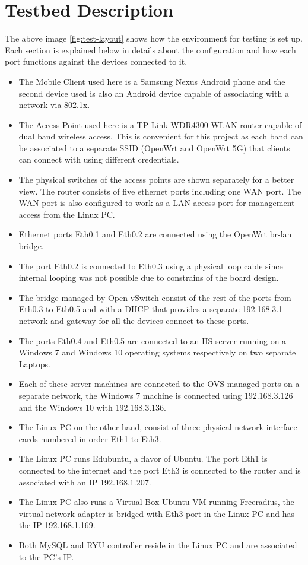 \section{Testbed Description}
The above image \ref{fig:test-layout} shows how the environment for testing is set up. Each section is explained below in details about the configuration and how each port functions against the devices connected to it.
\begin{itemize}
	\item The Mobile Client used here is a Samsung Nexus Android phone and the second device used is also an Android device capable of associating with a network via 802.1x.
	\item The Access Point used here is a TP-Link WDR4300 WLAN router capable of dual band wireless access. This is convenient for this project as each band can be associated to a separate SSID (OpenWrt and OpenWrt 5G) that clients can connect with using different credentials.
	\item The physical switches of the access points are shown separately for a better view. The router consists of five ethernet ports including one WAN port. The WAN port is also configured to work as a LAN access port for management access from the Linux PC. 
	\item Ethernet ports Eth0.1 and Eth0.2 are connected using the OpenWrt br-lan bridge.
	\item The port Eth0.2 is connected to Eth0.3 using a physical loop cable since internal looping was not possible due to constrains of the board design.
	\item The bridge managed by Open vSwitch consist of the rest of the ports from Eth0.3 to Eth0.5 and with a DHCP that provides a separate 192.168.3.1 network and gateway for all the devices connect to these ports.
	\item The ports Eth0.4 and Eth0.5 are connected to an IIS server running on a Windows 7 and Windows 10 operating systems respectively on two separate Laptops.
	\item Each of these server machines are connected to the OVS managed ports on a separate network, the Windows 7 machine is connected using 192.168.3.126 and the Windows 10 with 192.168.3.136.
	\item The Linux PC on the other hand, consist of three physical network interface cards numbered in order Eth1 to Eth3.
	\item The Linux PC runs Edubuntu, a flavor of Ubuntu. The port Eth1 is connected to the internet and the port Eth3 is connected to the router and is associated with an IP 192.168.1.207.
	\item The Linux PC also runs a Virtual Box Ubuntu VM running Freeradius, the virtual network adapter is bridged with Eth3 port in the Linux PC and has the IP 192.168.1.169.
	\item Both MySQL and RYU controller reside in the Linux PC and are associated to the PC’s IP.
	
\end{itemize}

